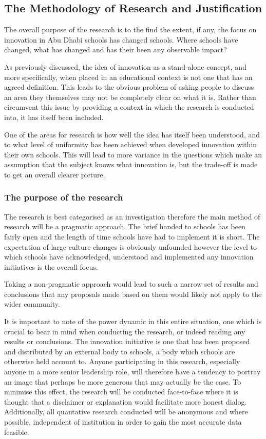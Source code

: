 \subsection{The Methodology of Research and Justification}
The overall purpose of the research is to the find the extent, if any, the focus on innovation in Abu Dhabi schools has changed schools. Where schools have changed, what has changed and has their been any observable impact?

As previously discussed, the idea of innovation as a stand-alone concept, and more specifically, when placed in an educational context is not one that has an agreed definition. This leads to the obvious problem of asking people to discuss an area they themselves may not be completely clear on what it is. Rather than circumvent this issue by providing a context in which the research is conducted into, it has itself been included.

One of the areas for research is how well the idea has itself been understood, and to what level of uniformity has been achieved when developed innovation within their own schools. This will lead to more variance in the questions which make an assumption that the subject knows what innovation is, but the trade-off is made to get an overall clearer picture.

\subsubsection{The purpose of the research}
The research is best categorised as an investigation therefore the main method of research will be a pragmatic approach. The brief handed to schools has been fairly open and the length of time schools have had to implement it is short. The expectation of large culture changes is obviously unfounded however the level to which schools have acknowledged, understood and implemented any innovation initiatives is the overall focus. 

Taking a non-pragmatic approach would lead to such a narrow set of results and conclusions that any proposals made based on them would likely not apply to the wider community. 

It is important to note of the power dynamic in this entire situation, one which is crucial to bear in mind when conducting the research, or indeed reading any results or conclusions. The innovation initiative is one that has been proposed and distributed by an external body to schools, a body which schools are otherwise held account to. Anyone participating in this research, especially anyone in a more senior leadership role, will therefore have a tendency to portray an image that perhaps be more generous that may actually be the case. To minimise this effect, the research will be conducted face-to-face where it is thought that a disclaimer or explanation would facilitate more honest dialog. Additionally, all quantative research conducted will be anonymous and where possible, independent of institution in order to gain the most accurate data feasible.

